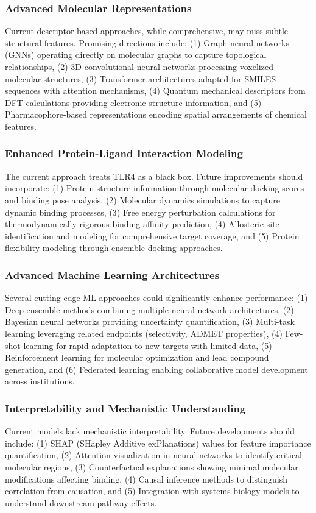 \documentclass[preprint, 10pt]{elsarticle}
\begin{document}
\subsubsection{Advanced Molecular Representations}
Current descriptor-based approaches, while comprehensive, may miss subtle structural features. Promising directions include: (1) Graph neural networks (GNNs) operating directly on molecular graphs to capture topological relationships, (2) 3D convolutional neural networks processing voxelized molecular structures, (3) Transformer architectures adapted for SMILES sequences with attention mechanisms, (4) Quantum mechanical descriptors from DFT calculations providing electronic structure information, and (5) Pharmacophore-based representations encoding spatial arrangements of chemical features.

\subsubsection{Enhanced Protein-Ligand Interaction Modeling}
The current approach treats TLR4 as a black box. Future improvements should incorporate: (1) Protein structure information through molecular docking scores and binding pose analysis, (2) Molecular dynamics simulations to capture dynamic binding processes, (3) Free energy perturbation calculations for thermodynamically rigorous binding affinity prediction, (4) Allosteric site identification and modeling for comprehensive target coverage, and (5) Protein flexibility modeling through ensemble docking approaches.

\subsubsection{Advanced Machine Learning Architectures}
Several cutting-edge ML approaches could significantly enhance performance: (1) Deep ensemble methods combining multiple neural network architectures, (2) Bayesian neural networks providing uncertainty quantification, (3) Multi-task learning leveraging related endpoints (selectivity, ADMET properties), (4) Few-shot learning for rapid adaptation to new targets with limited data, (5) Reinforcement learning for molecular optimization and lead compound generation, and (6) Federated learning enabling collaborative model development across institutions.

\subsubsection{Interpretability and Mechanistic Understanding}
Current models lack mechanistic interpretability. Future developments should include: (1) SHAP (SHapley Additive exPlanations) values for feature importance quantification, (2) Attention visualization in neural networks to identify critical molecular regions, (3) Counterfactual explanations showing minimal molecular modifications affecting binding, (4) Causal inference methods to distinguish correlation from causation, and (5) Integration with systems biology models to understand downstream pathway effects.
\end{document}
